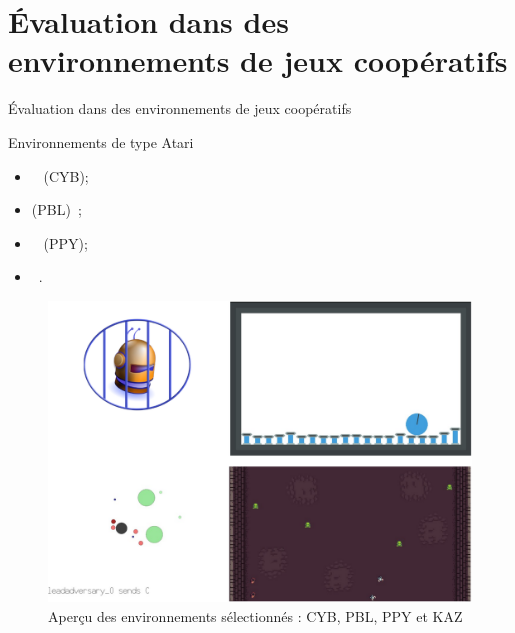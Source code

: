 

\section{Évaluation dans des environnements de jeux coopératifs}

\begin{frame}{Évaluation dans des environnements de jeux coopératifs}

    \begin{block}{Environnements de type Atari}

        \begin{minipage}{0.5\textwidth}
            \centering
            \begin{itemize}
                \item {}~\parencite{cage_challenge_3_announcement} (CYB);
                \item {} (PBL)~\parencite{Terry2021};
                \item {}~\parencite{Lowe2017} (PPY);
                \item {}~\parencite{Terry2021}.
            \end{itemize}
        \end{minipage}\hfill
        \begin{minipage}{0.5\textwidth}
            \centering
            \begin{figure}[H]
                \centering
                \includegraphics[width=0.5\linewidth]{figures/envs_4x4.png}
                \caption*{Aperçu des environnements sélectionnés : CYB, PBL, PPY et KAZ}
                \label{fig:simulated_environments}
            \end{figure}
        \end{minipage}\hfill


\end{block}
\end{frame}
